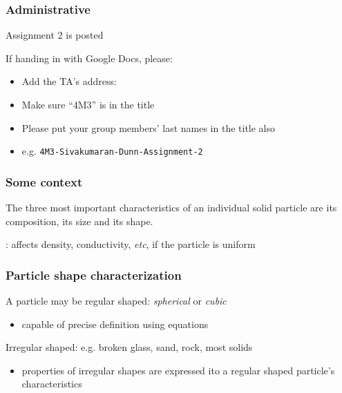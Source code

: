 \begin{frame}\frametitle{Administrative}
	Assignment 2 is posted
	
	\vspace{12pt}
	If handing in with Google Docs, please:
	\begin{itemize}
		\item	Add the TA's address: {}
		\item	Make sure ``4M3'' is in the title
		\item	Please put your group members' last names in the title also
		\item	e.g. \texttt{4M3-Sivakumaran-Dunn-Assignment-2}
	\end{itemize}
\end{frame}

\begin{frame}\frametitle{Some context}
	\begin{exampleblock}{}
		The three most important characteristics of an individual solid particle are its composition, its size and its shape. 
	\end{exampleblock}
		
	\vspace{12pt}
	{\color{myGreen}{Composition}}: affects density, conductivity, \emph{etc}, if the particle is uniform	
\end{frame}

\begin{frame}\frametitle{Particle shape characterization}
	
	A particle may be regular shaped: \emph{spherical} or \emph{cubic}
	\begin{itemize}
		\item	capable of precise definition using equations
	\end{itemize}
	
	\vspace{12pt}
	Irregular shaped: e.g. broken glass, sand, rock, most solids
	\begin{itemize}
		\item	properties of irregular shapes are expressed ito a regular shaped particle's characteristics
	\end{itemize}
\end{frame}

